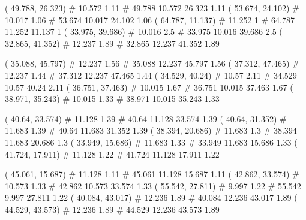 \documentclass[a4paper,openbib,10pt]{article}
\newenvironment{treegraph}{\begin{graph}}{\end{graph}}
\begin{document}
\begin{treegraph}
  ( 49.788, 26.323) #     10.572    1.11
   #    49.788    10.572    26.323    1.11
  ( 53.674, 24.102) #     10.017    1.06
   #    53.674    10.017    24.102    1.06
  ( 64.787, 11.137) #     11.252    1
   #    64.787    11.252    11.137    1
  ( 33.975, 39.686) #     10.016    2.5
   #    33.975    10.016    39.686    2.5
  ( 32.865, 41.352) #     12.237    1.89
   #    32.865    12.237    41.352    1.89

  ( 35.088, 45.797) #     12.237    1.56
   #    35.088    12.237    45.797    1.56
  ( 37.312, 47.465) #     12.237    1.44
   #    37.312    12.237    47.465    1.44
  ( 34.529, 40.24) #     10.57    2.11
   #    34.529    10.57    40.24    2.11
  ( 36.751, 37.463) #     10.015    1.67
   #    36.751    10.015    37.463    1.67
  ( 38.971, 35.243) #     10.015    1.33
   #    38.971    10.015    35.243    1.33

  ( 40.64, 33.574) #     11.128    1.39
   #    40.64    11.128    33.574    1.39
  ( 40.64, 31.352) #     11.683    1.39
   #    40.64    11.683    31.352    1.39
  ( 38.394, 20.686) #     11.683    1.3
   #    38.394    11.683    20.686    1.3
  ( 33.949, 15.686) #     11.683    1.33
   #    33.949    11.683    15.686    1.33
  ( 41.724, 17.911) #     11.128    1.22
   #    41.724    11.128    17.911    1.22

  ( 45.061, 15.687) #     11.128    1.11
   #    45.061    11.128    15.687    1.11
  ( 42.862, 33.574) #     10.573    1.33
   #    42.862    10.573    33.574    1.33
  ( 55.542, 27.811) #     9.997    1.22
   #    55.542    9.997    27.811    1.22
  ( 40.084, 43.017) #     12.236    1.89
   #    40.084    12.236    43.017    1.89
  ( 44.529, 43.573) #     12.236    1.89
   #    44.529    12.236    43.573    1.89


\end{treegraph}
\end{document}
